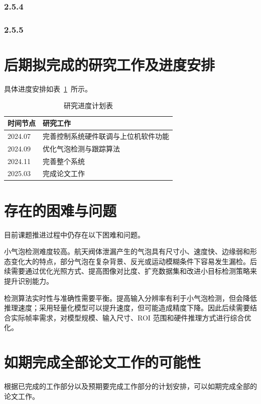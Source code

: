 \subsubsection{2.5.4}

\subsubsection{2.5.5}

\section{后期拟完成的研究工作及进度安排}

具体进度安排如表~\ref{tab:schedule}~所示。

\begin{table}[htbp]
  \caption{研究进度计划表}\label{tab:schedule}
\vspace{0.5em}\centering\wuhao
\begin{tabularx}{\textwidth}{@{}lX@{}}
\toprule
时间节点 & 研究工作 \\
\midrule
2024.07 & 完善控制系统硬件联调与上位机软件功能 \\
2024.09 & 优化气泡检测与跟踪算法 \\
2024.11 & 完善整个系统 \\
2025.03 & 完成论文工作 \\
\bottomrule
\end{tabularx}
\end{table}

\section{存在的困难与问题}

目前课题推进过程中仍存在以下困难和问题。

小气泡检测难度较高。航天阀体泄漏产生的气泡具有尺寸小、速度快、边缘弱和形态变化大的特点，部分气泡在复杂背景、反光或运动模糊条件下容易发生漏检。后续需要通过优化光照方式、提高图像对比度、扩充数据集和改进小目标检测策略来提升识别能力。

检测算法实时性与准确性需要平衡。提高输入分辨率有利于小气泡检测，但会降低推理速度；采用轻量化模型可以提升速度，但可能造成精度下降。因此后续需要结合实际帧率需求，对模型规模、输入尺寸、ROI 范围和硬件推理方式进行综合优化。

\section{如期完成全部论文工作的可能性}

根据已完成的工作部分以及预期要完成工作部分的计划安排，可以如期完成全部的论文工作。


